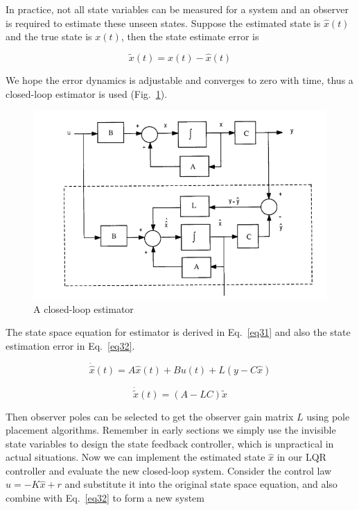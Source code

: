 \documentclass[hyperref]{article}
\theoremstyle{nonumberplain}
\begin{document}
	\hspace{1.0em}
	In practice, not all state variables can be measured for a system and an observer is required to estimate these unseen states. Suppose the estimated state is $\hat{x}(t)$ and the true state is $x(t)$, then the state estimate error is
	
	\begin{equation}
	\tilde{x}(t)=x(t)-\hat{x}(t)
	\label{eq30}
	\end{equation}
	
	We hope the error dynamics is adjustable and converges to zero with time, thus a closed-loop estimator is used (Fig.~\ref{fig15}).
	
	\begin{figure}[htbp]
		\centering
		\includegraphics[width=0.6\linewidth]{fig20.png}
		\caption{A closed-loop estimator}
		\label{fig15}
	\end{figure}

	The state space equation for estimator is derived in Eq.~\ref{eq31} and also the state estimation error in Eq.~\ref{eq32}.
	
	\begin{equation}
	\dot{\hat{x}}(t)=A\hat{x}(t)+Bu(t)+L(y-C\hat{x})
	\label{eq31}
	\end{equation}
	
	\begin{equation}
	\dot{\tilde{x}}(t)=(A-LC)\tilde{x}
	\label{eq32}
	\end{equation}
	
	Then observer poles can be selected to get the observer gain matrix $L$ using pole placement algorithms. Remember in early sections we simply use the invisible state variables to design the state feedback controller, which is unpractical in actual situations. Now we can implement the estimated state $\hat{x}$ in our LQR controller and evaluate the new closed-loop system. Consider the control law $u=-K\hat{x}+r$ and substitute it into the original state space equation, and also combine with Eq.~\ref{eq32} to form a new system
		
\end{document}
